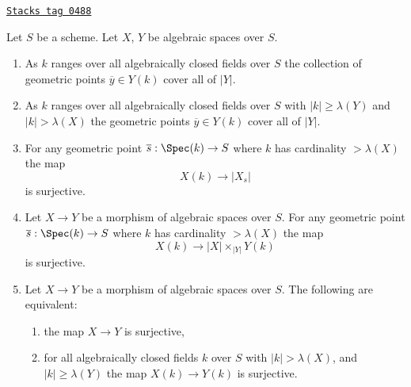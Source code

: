 \begin{lemma}
\label{spaces-morphisms-lemma-large-enough}
\href{https://stacks.math.columbia.edu/tag/0488}{\texttt{Stacks tag 0488}}

Let $S$ be a scheme. Let $X$, $Y$ be algebraic spaces over $S$.
\begin{enumerate}
\item As $k$ ranges over all algebraically closed fields over $S$
the collection of geometric points $\overline{y} \in Y(k)$ cover all of $|Y|$.
\item As $k$ ranges over all algebraically closed fields over $S$ with
$|k| \geq \lambda(Y)$ and $|k| > \lambda(X)$ the geometric points
$\overline{y} \in Y(k)$ cover all of $|Y|$.
\item For any geometric point
$\overline{s} : \Spec(k) \to S$ where
$k$ has cardinality $> \lambda(X)$ the map
$$
X(k) \longrightarrow |X_s|
$$
is surjective.
\item Let $X \to Y$ be a morphism of algebraic spaces over $S$.
For any geometric point $\overline{s} : \Spec(k) \to S$ where
$k$ has cardinality $> \lambda(X)$ the map
$$
X(k) \longrightarrow |X| \times_{|Y|} Y(k)
$$
is surjective.
\item Let $X \to Y$ be a morphism of algebraic spaces over $S$.
The following are equivalent:
\begin{enumerate}
\item the map $X \to Y$ is surjective,
\item for all algebraically closed fields $k$ over $S$ with
$|k| > \lambda(X)$, and $|k| \geq \lambda(Y)$ the map $X(k) \to Y(k)$
is surjective.
\end{enumerate}
\end{enumerate}
\end{lemma}


